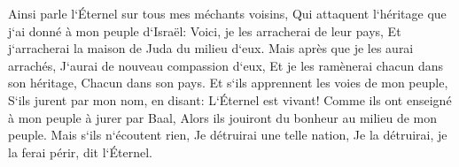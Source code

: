 \verse Ainsi parle l`Éternel sur tous mes méchants voisins, Qui attaquent l`héritage que j`ai donné à mon peuple d`Israël: Voici, je les arracherai de leur pays, Et j`arracherai la maison de Juda du milieu d`eux. 
\verse Mais après que je les aurai arrachés, J`aurai de nouveau compassion d`eux, Et je les ramènerai chacun dans son héritage, Chacun dans son pays. 
\verse Et s`ils apprennent les voies de mon peuple, S`ils jurent par mon nom, en disant: L`Éternel est vivant! Comme ils ont enseigné à mon peuple à jurer par Baal, Alors ils jouiront du bonheur au milieu de mon peuple. 
\verse Mais s`ils n`écoutent rien, Je détruirai une telle nation, Je la détruirai, je la ferai périr, dit l`Éternel. 

\chapter{}


